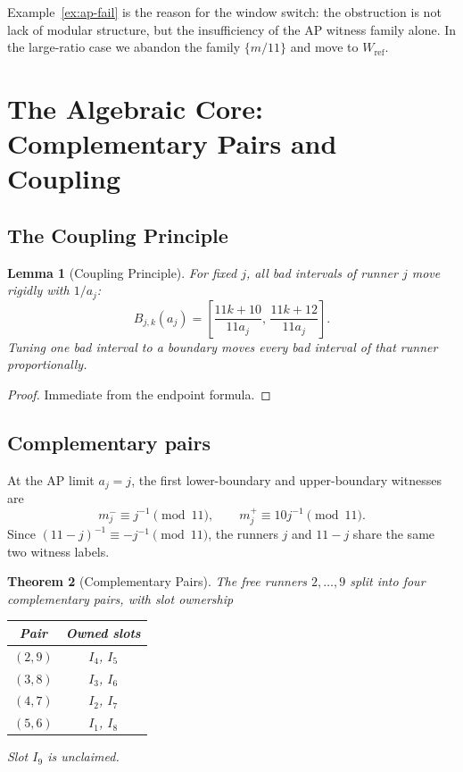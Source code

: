 \documentclass[12pt,a4paper]{amsart}
\newtheorem{theorem}{Theorem}[section]
\newtheorem{lemma}[theorem]{Lemma}
\theoremstyle{definition}
\theoremstyle{remark}
\newcommand{\Wref}{W_{\mathrm{ref}}}
\begin{document}
Example~\ref{ex:ap-fail} is the reason for the window switch: the obstruction is not lack
of modular structure, but the insufficiency of the AP witness family alone. In the large-ratio
case we abandon the family $\{m/11\}$ and move to $\Wref$.

\section{The Algebraic Core: Complementary Pairs and Coupling}

\subsection{The Coupling Principle}

\begin{lemma}[Coupling Principle]\label{lem:coupling}
For fixed $j$, all bad intervals of runner $j$ move rigidly with $1/a_j$:
\[
  B_{j,k}(a_j) = \left[\frac{11k+10}{11a_j},\,\frac{11k+12}{11a_j}\right].
\]
Tuning one bad interval to a boundary moves every bad interval of that runner proportionally.
\end{lemma}

\begin{proof}
Immediate from the endpoint formula.
\end{proof}

\subsection{Complementary pairs}

At the AP limit $a_j=j$, the first lower-boundary and upper-boundary witnesses are
\[
  m_j^- \equiv j^{-1}\pmod{11},\qquad m_j^+ \equiv 10j^{-1}\pmod{11}.
\]
Since $(11-j)^{-1}\equiv -j^{-1}\pmod{11}$, the runners $j$ and $11-j$ share the same two
witness labels.

\begin{theorem}[Complementary Pairs]\label{thm:comp-pairs}
The free runners $2,\ldots,9$ split into four complementary pairs, with slot ownership

\medskip
\begin{center}
\begin{tabular}{cc}
\toprule
Pair & Owned slots \\
\midrule
$(2,9)$ & $I_4$, $I_5$ \\
$(3,8)$ & $I_3$, $I_6$ \\
$(4,7)$ & $I_2$, $I_7$ \\
$(5,6)$ & $I_1$, $I_8$ \\
\bottomrule
\end{tabular}
\end{center}

\medskip\noindent
Slot $I_9$ is unclaimed.
\end{theorem}
\end{document}
